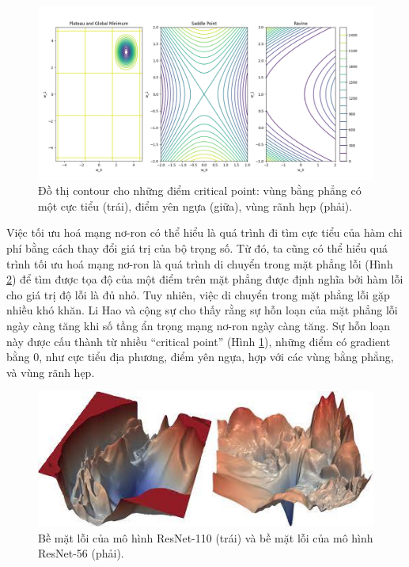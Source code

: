 \begin{figure}[htp]
\centering
\includegraphics[width=120 mm]{images/cricial-point-contour.png}
\caption{Đồ thị contour cho những điểm critical point: vùng bằng phẳng có một cực tiểu (trái), điểm yên ngựa (giữa), vùng rãnh hẹp (phải).}
\label{fig:cricial-point-contour}
\end{figure}

Việc tối ưu hoá mạng nơ-ron có thể hiểu là quá trình đi tìm cực tiểu của hàm chi phí bằng cách thay đổi giá trị của bộ trọng số. Từ đó, ta cũng có thể hiểu quá trình tối ưu hoá mạng nơ-ron là quá trình di chuyển trong mặt phẳng lỗi (Hình \ref{fig:resnet-loss}) để tìm được tọa độ của một điểm trên mặt phẳng được định nghĩa bởi hàm lỗi cho giá trị độ lỗi là đủ nhỏ. Tuy nhiên, việc di chuyển trong mặt phẳng lỗi gặp nhiều khó khăn. Li Hao và cộng sự\cite{li2018visualizing} cho thấy rằng sự hỗn loạn của mặt phẳng lỗi ngày càng tăng khi số tầng ẩn trọng mạng nơ-ron ngày càng tăng. Sự hỗn loạn này được cấu thành từ nhiều ``critical point'' (Hình \ref{fig:cricial-point-contour}), những điểm có gradient bằng 0, như cực tiểu địa phương, điểm yên ngựa, hợp với các vùng bằng phẳng, và vùng rãnh hẹp.

\begin{figure}[htp]
\centering
\includegraphics[width=120 mm]{images/resnet-loss.png}
\caption{Bề mặt lỗi của mô hình ResNet-110 (trái) và bề mặt lỗi của mô hình ResNet-56 (phải).\cite{li2018visualizing}}
\label{fig:resnet-loss}
\end{figure}

